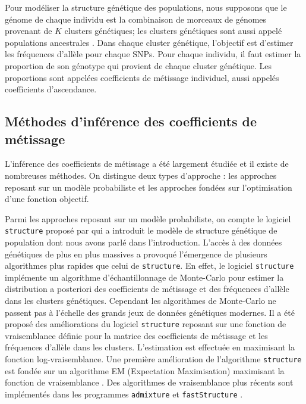 \documentclass[12pt,a4paper,twoside]{ugathesis}
\begin{document}
Pour modéliser la structure génétique des populations, nous supposons que le
génome de chaque individu est la combinaison de morceaux de génomes provenant de
\(K\) clusters génétiques; les clusters génétiques sont aussi appelé populations
ancestrales \citep{Pritchard2000}. Dans chaque cluster génétique, l'objectif est
d'estimer les fréquences d'allèle pour chaque SNPs. Pour chaque individu, il
faut estimer la proportion de son génotype qui provient de chaque cluster
génétique. Les proportions sont appelées coefficients de métissage individuel,
aussi appelés coefficients d'ascendance.

\subsection{Méthodes d'inférence des coefficients de métissage}
\label{sec:orgd4b9a55}
L'inférence des coefficients de métissage a été largement étudiée et il existe
de nombreuses méthodes. On distingue deux types d'approche : les approches
reposant sur un modèle probabiliste et les approches fondées sur l'optimisation
d'une fonction objectif.

Parmi les approches reposant sur un modèle probabiliste, on compte le logiciel
\texttt{structure} proposé par \citet{Pritchard2000} qui a introduit le modèle de
structure génétique de population dont nous avons parlé dans l'introduction.
L'accès à des données génétiques de plus en plus massives a provoqué l'émergence
de plusieurs algorithmes plus rapides que celui de \texttt{structure}. En effet, le
logiciel \texttt{structure} implémente un algorithme d'échantillonnage de Monte-Carlo
pour estimer la distribution a posteriori des coefficients de métissage et des
fréquences d'allèle dans les clusters génétiques. Cependant les algorithmes de
Monte-Carlo ne passent pas à l'échelle des grands jeux de données génétiques
modernes. Il a été proposé des améliorations du logiciel \texttt{structure} reposant
sur une fonction de vraisemblance définie pour la matrice des coefficients de
métissage et les fréquences d'allèle dans les clusters. L'estimation est
effectuée en maximisant la fonction log-vraisemblance. Une première amélioration
de l'algorithme \texttt{structure} est fondée sur un algorithme EM (Expectation
Maximisation) maximisant la fonction de vraisemblance \citep{Tang_2005}. Des
algorithmes de vraisemblance plus récents sont implémentés dans les programmes
\texttt{admixture} et \texttt{fastStructure} \citep{Alexander_2011,Raj_2014}.
\end{document}
